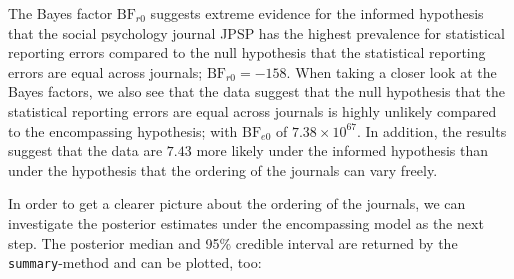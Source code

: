 \documentclass[
  english,
  man,floatsintext]{apa6}
\newenvironment{Shaded}{\begin{snugshade}}{\end{snugshade}}
\newcommand{\NormalTok}[1]{#1}
\newcommand{\OperatorTok}[1]{\textcolor[rgb]{0.81,0.36,0.00}{\textbf{#1}}}
\newcommand{\StringTok}[1]{\textcolor[rgb]{0.31,0.60,0.02}{#1}}
\begin{document}
\begin{Shaded}
\end{Shaded}

The Bayes factor \(\text{BF}_{r0}\) suggests extreme evidence for the informed hypothesis that the social psychology journal JPSP has the highest prevalence for statistical reporting errors compared to the null hypothesis that the statistical reporting errors are equal across journals; \(\text{BF}_{r0} = -158\).
When taking a closer look at the Bayes factors, we also see that the data suggest that the null hypothesis that the statistical reporting errors are equal across journals is highly unlikely compared to the encompassing hypothesis; with \(\text{BF}_{e0}\) of \(7.38 \times 10^{67}\). In addition, the results suggest that the data are \(7.43\) more likely under the informed hypothesis than under the hypothesis that the ordering of the journals can vary freely.

In order to get a clearer picture about the ordering of the journals, we can investigate the posterior estimates
under the encompassing model as the next step. The posterior median and 95\% credible interval are returned by the \texttt{summary}-method and can be plotted, too:
\end{document}
